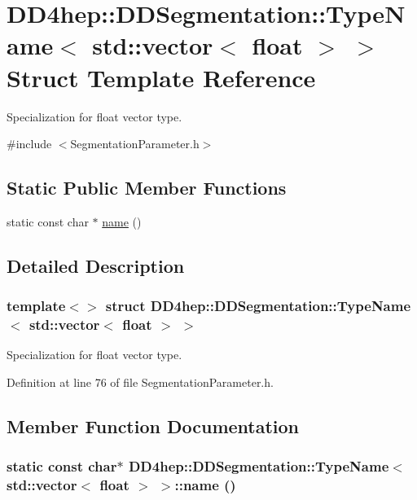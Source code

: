 \hypertarget{struct_d_d4hep_1_1_d_d_segmentation_1_1_type_name_3_01std_1_1vector_3_01float_01_4_01_4}{
\section{DD4hep::DDSegmentation::TypeName$<$ std::vector$<$ float $>$ $>$ Struct Template Reference}
\label{struct_d_d4hep_1_1_d_d_segmentation_1_1_type_name_3_01std_1_1vector_3_01float_01_4_01_4}
}


Specialization for float vector type.  


{\ttfamily \#include $<$SegmentationParameter.h$>$}\subsection*{Static Public Member Functions}
\begin{DoxyCompactItemize}
\item 
static const char $\ast$ \hyperlink{struct_d_d4hep_1_1_d_d_segmentation_1_1_type_name_3_01std_1_1vector_3_01float_01_4_01_4_ab90b0133e8df2f36770110b233da7e42}{name} ()
\end{DoxyCompactItemize}


\subsection{Detailed Description}
\subsubsection*{template$<$$>$ struct DD4hep::DDSegmentation::TypeName$<$ std::vector$<$ float $>$ $>$}

Specialization for float vector type. 

Definition at line 76 of file SegmentationParameter.h.

\subsection{Member Function Documentation}
\hypertarget{struct_d_d4hep_1_1_d_d_segmentation_1_1_type_name_3_01std_1_1vector_3_01float_01_4_01_4_ab90b0133e8df2f36770110b233da7e42}{
\subsubsection[{name}]{\setlength{\rightskip}{0pt plus 5cm}static const char$\ast$ {\bf DD4hep::DDSegmentation::TypeName}$<$ std::vector$<$ float $>$ $>$::name ()}}
\label{struct_d_d4hep_1_1_d_d_segmentation_1_1_type_name_3_01std_1_1vector_3_01float_01_4_01_4_ab90b0133e8df2f36770110b233da7e42}


